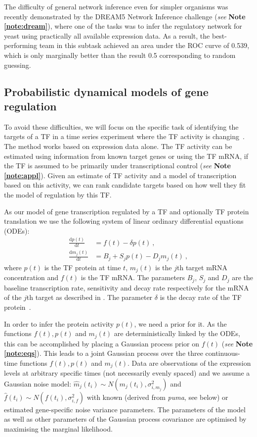 \documentclass[11pt]{article}
\newcommand{\noteref}[1]{\emph{see} \textbf{Note \ref{#1}}}
\begin{document}
The difficulty of general network inference even for simpler organisms
was recently demonstrated by the DREAM5 Network Inference
challenge (\noteref{note:dream}),
where one of the tasks was to infer the regulatory network for yeast
using practically all available expression data.  As a result, the
best-performing team in this subtask achieved an area under the ROC
curve of 0.539, which is only marginally better than the result 0.5
corresponding to random guessing.

\subsection{Probabilistic dynamical models of gene regulation}

To avoid these difficulties, we will focus on the specific task of
identifying the targets of a TF in a time series experiment where the
TF activity is changing~\cite{Gao2008,Honkela2010PNAS}.  The method
works based on expression data alone.  The TF activity can be
estimated using information from known target genes or using the TF
mRNA, if the TF is assumed to be primarily under transcriptional
control (\noteref{note:appl}).
Given an estimate of TF activity and a model of
transcription based on this activity, we can rank candidate targets
based on how well they fit the model of regulation by this TF.

As our model of gene transcription regulated by a TF and optionally
TF protein translation we use the following system of linear ordinary
differential equations (ODEs):
\begin{align}
  \frac{\mathrm{d}p(t)}{\mathrm{d}t} & = f(t) - \delta
  p(t) \ , \label{eq:translation_ode} \\
  \frac{\mathrm{d}m_j(t)}{\mathrm{d}t} & = B_j+S_j p(t)-D_j m_j(t) \ , \label{eq:transcription_ode}
\end{align}
where $p(t)$ is the TF protein at time $t$, $m_j(t)$ is the $j$th
target mRNA concentration and $f(t)$ is the TF mRNA. The parameters
$B_j$, $S_j$ and $D_j$ are the baseline transcription rate,
sensitivity and decay rate respectively for the mRNA of the $j$th
target as described in \cite{Barenco2006a}.  The parameter
$\delta$ is the decay rate of the TF protein~\cite{Honkela2010PNAS}.

In order to infer the protein activity $p(t)$, we need a prior for it.
As the functions $f(t), p(t)$ and $m_j(t)$ are deterministically
linked by the ODEs, this can be accomplished by placing a Gaussian
process prior on $f(t)$ (\noteref{note:eqs}).
This leads to a joint Gaussian process over the three continuous-time
functions $f(t),p(t)$ and $m_j(t)$.  Data are observations of the
expression levels at arbitrary specific times (not necessarily evenly
spaced) and we assume a Gaussian noise model: $\hat{m}_j(t_i) \sim
N(m_j(t_i),\sigma_{i,m_j}^2)$ and $\hat{f}(t_i) \sim
N(f(t_i),\sigma_{i,f}^2)$ with known (derived from \emph{puma}, see
below) or estimated gene-specific noise variance parameters. The
parameters of the model as well as other parameters of the Gaussian
process covariance are optimised by maximising the marginal
likelihood.
\end{document}
